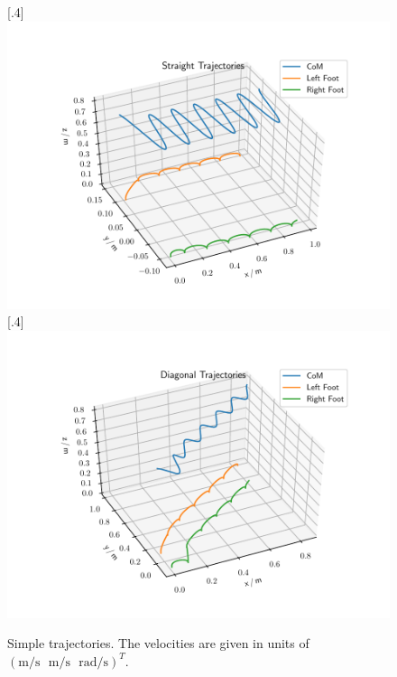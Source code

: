 \begin{figure}[h!]
	\centering
	[.4\linewidth]{\includegraphics[scale=.35]{chapters/05_experiments/01_user_controlled_walking/01_benchmarking/nmpc_straight.pdf}}
	[.4\linewidth]{\includegraphics[scale=.35]{chapters/05_experiments/01_user_controlled_walking/01_benchmarking/nmpc_diagonal.pdf}}
	\caption{Simple trajectories. The velocities are given in units of\\$(\text{m}/\text{s}\,\,\,\,\text{m}/\text{s}\,\,\,\,\text{rad}/\text{s})^T$.}
	\label{fig::511_benchmarking_basic}
\end{figure} 
